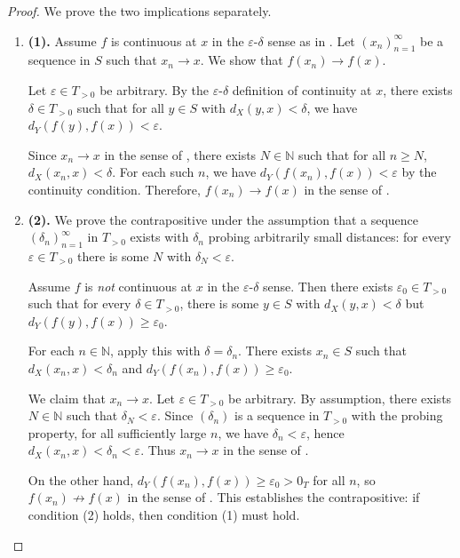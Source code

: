 \begin{proof}
    We prove the two implications separately.

    \begin{enumerate}
        \item \textbf{(1).} Assume $f$ is continuous at $x$ in the $\varepsilon$-$\delta$ sense as in . Let $(x_n)_{n=1}^\infty$ be a sequence in $S$ such that $x_n \to x$. We show that $f(x_n) \to f(x)$.

        Let $\varepsilon \in T_{>0}$ be arbitrary. By the $\varepsilon$-$\delta$ definition of continuity at $x$, there exists $\delta \in T_{>0}$ such that for all $y \in S$ with $d_X(y, x) < \delta$, we have $d_Y(f(y), f(x)) < \varepsilon$.

        Since $x_n \to x$ in the sense of , there exists $N \in \mathbb{N}$ such that for all $n \geq N$, $d_X(x_n, x) < \delta$. For each such $n$, we have $d_Y(f(x_n), f(x)) < \varepsilon$ by the continuity condition. Therefore, $f(x_n) \to f(x)$ in the sense of .

        \item \textbf{(2).} We prove the contrapositive under the assumption that a sequence $(\delta_n)_{n=1}^\infty$ in $T_{>0}$ exists with $\delta_n$ probing arbitrarily small distances: for every $\varepsilon \in T_{>0}$ there is some $N$ with $\delta_N < \varepsilon$.

        Assume $f$ is \emph{not} continuous at $x$ in the $\varepsilon$-$\delta$ sense. Then there exists $\varepsilon_0 \in T_{>0}$ such that for every $\delta \in T_{>0}$, there is some $y \in S$ with $d_X(y, x) < \delta$ but $d_Y(f(y), f(x)) \geq \varepsilon_0$.

        For each $n \in \mathbb{N}$, apply this with $\delta = \delta_n$. There exists $x_n \in S$ such that $d_X(x_n, x) < \delta_n$ and $d_Y(f(x_n), f(x)) \geq \varepsilon_0$.

        We claim that $x_n \to x$. Let $\varepsilon \in T_{>0}$ be arbitrary. By assumption, there exists $N \in \mathbb{N}$ such that $\delta_N < \varepsilon$. Since $(\delta_n)$ is a sequence in $T_{>0}$ with the probing property, for all sufficiently large $n$, we have $\delta_n < \varepsilon$, hence $d_X(x_n, x) < \delta_n < \varepsilon$. Thus $x_n \to x$ in the sense of .

        On the other hand, $d_Y(f(x_n), f(x)) \geq \varepsilon_0 > 0_T$ for all $n$, so $f(x_n) \not\to f(x)$ in the sense of . This establishes the contrapositive: if condition (2) holds, then condition (1) must hold.
    \end{enumerate}
\end{proof}